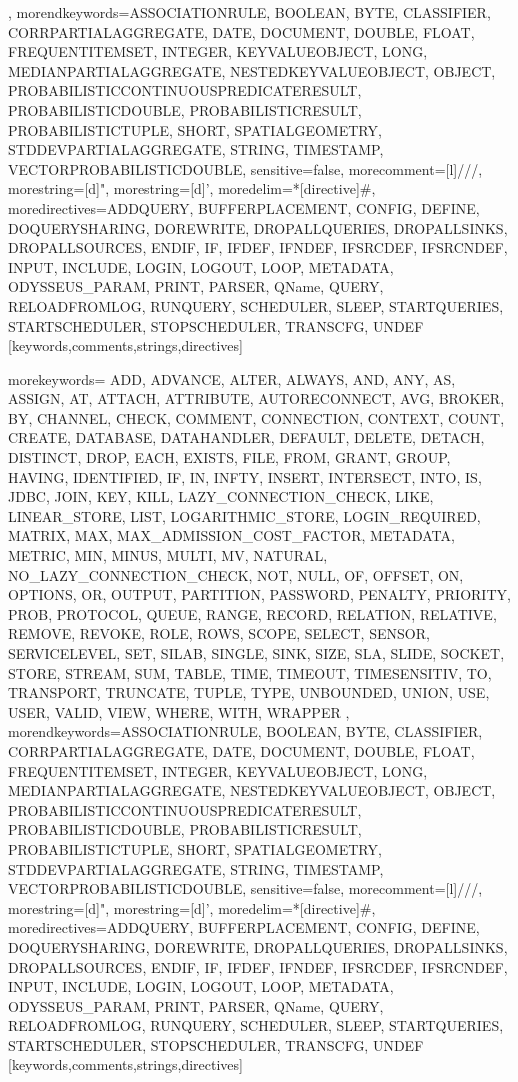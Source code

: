 {{      },%
   morendkeywords={ASSOCIATIONRULE, BOOLEAN, BYTE, CLASSIFIER, CORRPARTIALAGGREGATE, DATE, DOCUMENT, DOUBLE, FLOAT, FREQUENTITEMSET, INTEGER, KEYVALUEOBJECT, LONG, MEDIANPARTIALAGGREGATE, NESTEDKEYVALUEOBJECT, OBJECT, PROBABILISTICCONTINUOUSPREDICATERESULT, PROBABILISTICDOUBLE, PROBABILISTICRESULT, PROBABILISTICTUPLE, SHORT, SPATIALGEOMETRY, STDDEVPARTIALAGGREGATE, STRING, TIMESTAMP, VECTORPROBABILISTICDOUBLE},%
   sensitive=false,
   morecomment=[l]///,%
   morestring=[d]",%
   morestring=[d]',%
   moredelim=*[directive]\#,%
   moredirectives={ADDQUERY, BUFFERPLACEMENT, CONFIG, DEFINE, DOQUERYSHARING, DOREWRITE, DROPALLQUERIES, DROPALLSINKS, DROPALLSOURCES, ENDIF, IF, IFDEF, IFNDEF, IFSRCDEF, IFSRCNDEF, INPUT, INCLUDE, LOGIN, LOGOUT, LOOP, METADATA, ODYSSEUS_PARAM, PRINT, PARSER, QName, QUERY, RELOADFROMLOG, RUNQUERY, SCHEDULER, SLEEP, STARTQUERIES, STARTSCHEDULER, STOPSCHEDULER, TRANSCFG, UNDEF}%
}[keywords,comments,strings,directives]

%
   {morekeywords={%
ADD, ADVANCE, ALTER, ALWAYS, AND, ANY, AS, ASSIGN, AT, ATTACH, ATTRIBUTE, AUTORECONNECT, AVG, BROKER, BY, CHANNEL, CHECK, COMMENT, CONNECTION, CONTEXT, COUNT, CREATE, DATABASE, DATAHANDLER, DEFAULT, DELETE, DETACH, DISTINCT, DROP, EACH, EXISTS, FILE, FROM, GRANT, GROUP, HAVING, IDENTIFIED, IF, IN, INFTY, INSERT, INTERSECT, INTO, IS, JDBC, JOIN, KEY, KILL, LAZY_CONNECTION_CHECK, LIKE, LINEAR_STORE, LIST, LOGARITHMIC_STORE, LOGIN_REQUIRED, MATRIX, MAX, MAX_ADMISSION_COST_FACTOR, METADATA, METRIC, MIN, MINUS, MULTI, MV, NATURAL, NO_LAZY_CONNECTION_CHECK, NOT, NULL, OF, OFFSET, ON, OPTIONS, OR, OUTPUT, PARTITION, PASSWORD, PENALTY, PRIORITY, PROB, PROTOCOL, QUEUE, RANGE, RECORD, RELATION, RELATIVE, REMOVE, REVOKE, ROLE, ROWS, SCOPE, SELECT, SENSOR, SERVICELEVEL, SET, SILAB, SINGLE, SINK, SIZE, SLA, SLIDE, SOCKET, STORE, STREAM, SUM, TABLE, TIME, TIMEOUT, TIMESENSITIV, TO, TRANSPORT, TRUNCATE, TUPLE, TYPE, UNBOUNDED, UNION, USE, USER, VALID, VIEW, WHERE, WITH, WRAPPER%
      },%
   morendkeywords={ASSOCIATIONRULE, BOOLEAN, BYTE, CLASSIFIER, CORRPARTIALAGGREGATE, DATE, DOCUMENT, DOUBLE, FLOAT, FREQUENTITEMSET, INTEGER, KEYVALUEOBJECT, LONG, MEDIANPARTIALAGGREGATE, NESTEDKEYVALUEOBJECT, OBJECT, PROBABILISTICCONTINUOUSPREDICATERESULT, PROBABILISTICDOUBLE, PROBABILISTICRESULT, PROBABILISTICTUPLE, SHORT, SPATIALGEOMETRY, STDDEVPARTIALAGGREGATE, STRING, TIMESTAMP, VECTORPROBABILISTICDOUBLE},%
   sensitive=false,
   morecomment=[l]///,%
   morestring=[d]",%
   morestring=[d]',%
   moredelim=*[directive]\#,%
   moredirectives={ADDQUERY, BUFFERPLACEMENT, CONFIG, DEFINE, DOQUERYSHARING, DOREWRITE, DROPALLQUERIES, DROPALLSINKS, DROPALLSOURCES, ENDIF, IF, IFDEF, IFNDEF, IFSRCDEF, IFSRCNDEF, INPUT, INCLUDE, LOGIN, LOGOUT, LOOP, METADATA, ODYSSEUS_PARAM, PRINT, PARSER, QName, QUERY, RELOADFROMLOG, RUNQUERY, SCHEDULER, SLEEP, STARTQUERIES, STARTSCHEDULER, STOPSCHEDULER, TRANSCFG, UNDEF}%
}[keywords,comments,strings,directives]

